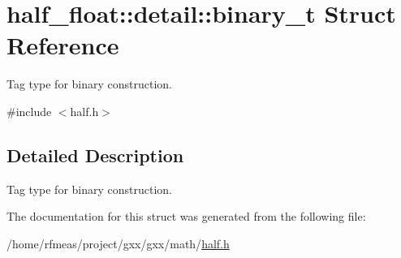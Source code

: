 \hypertarget{structhalf__float_1_1detail_1_1binary__t}{}\section{half\+\_\+float\+:\+:detail\+:\+:binary\+\_\+t Struct Reference}
\label{structhalf__float_1_1detail_1_1binary__t}


Tag type for binary construction.  




{\ttfamily \#include $<$half.\+h$>$}



\subsection{Detailed Description}
Tag type for binary construction. 

The documentation for this struct was generated from the following file\+:\begin{DoxyCompactItemize}
\item 
/home/rfmeas/project/gxx/gxx/math/\hyperlink{half_8h}{half.\+h}\end{DoxyCompactItemize}
